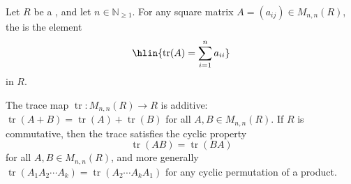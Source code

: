 \begin{definition} \label{definition:trace_of_a_matrix_over_a_ring}
    Let $R$ be a , and let $n \in \mathbb{N}_{\geq 1}$. For any square matrix $A = (a_{ij}) \in M_{n,n}(R)$, the  is the element
    $$\hlin{\operatorname{tr}(A) = \sum_{i=1}^n a_{ii}}$$
    in $R$.

    The trace map $\operatorname{tr}: M_{n,n}(R) \to R$ is additive: $\operatorname{tr}(A + B) = \operatorname{tr}(A) + \operatorname{tr}(B)$ for all $A, B \in M_{n,n}(R)$. If $R$ is commutative, then the trace satisfies the cyclic property
    $$\operatorname{tr}(AB) = \operatorname{tr}(BA)$$
    for all $A, B \in M_{n,n}(R)$, and more generally $\operatorname{tr}(A_1 A_2 \cdots A_k) = \operatorname{tr}(A_2 \cdots A_k A_1)$ for any cyclic permutation of a product.
\end{definition}
